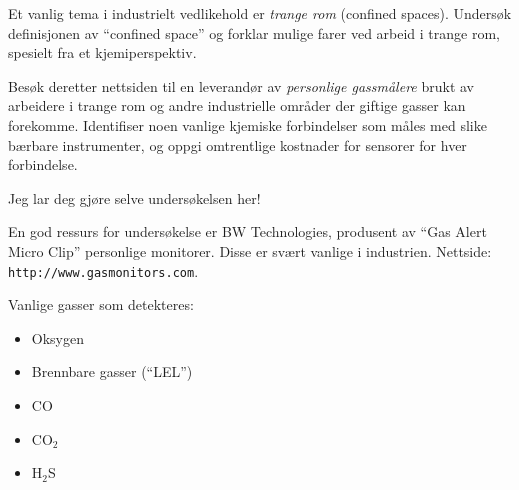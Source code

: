 

Et vanlig tema i industrielt vedlikehold er {\it trange rom} (confined spaces). Undersøk definisjonen av ``confined space'' og forklar mulige farer ved arbeid i trange rom, spesielt fra et kjemiperspektiv.

\vskip 10pt

Besøk deretter nettsiden til en leverandør av {\it personlige gassmålere} brukt av arbeidere i trange rom og andre industrielle områder der giftige gasser kan forekomme. Identifiser noen vanlige kjemiske forbindelser som måles med slike bærbare instrumenter, og oppgi omtrentlige kostnader for sensorer for hver forbindelse.







Jeg lar deg gjøre selve undersøkelsen her!







En god ressurs for undersøkelse er BW Technologies, produsent av ``Gas Alert Micro Clip'' personlige monitorer. Disse er svært vanlige i industrien. Nettside: {\tt http://www.gasmonitors.com}.

\vskip 10pt

Vanlige gasser som detekteres:

\begin{itemize}
\item{} Oksygen
\item{} Brennbare gasser (``LEL'')
\item{} CO
\item{} CO$_{2}$
\item{} H$_{2}$S
\end{itemize}



